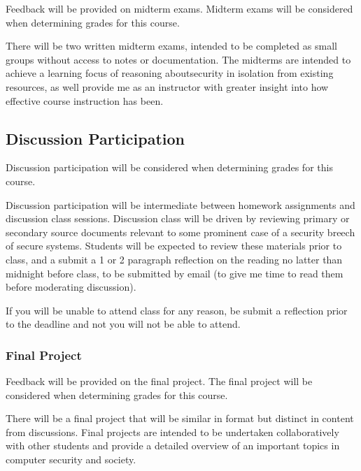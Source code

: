 \documentclass[11pt]{article}
\begin{document}
Feedback will be provided on midterm exams.  Midterm exams will be considered when determining grades for this course.

There will be two written midterm exams, intended to be completed as small groups
without access to notes or documentation. The midterms are intended to achieve a learning
focus of reasoning aboutsecurity in isolation from existing resources,
as well provide me as an instructor with greater insight into how effective course
instruction has been.

\subsection*{Discussion Participation}

Discussion participation will be considered when determining grades for this course.

Discussion participation will be intermediate between homework assignments and discussion class
sessions. Discussion class will be driven by reviewing primary or secondary source documents relevant to some prominent case of a security breech of secure systems. Students will be expected to review these materials prior to class, and a submit a 1 or 2 paragraph reflection on the reading no latter than midnight before class, to be submitted by email (to give me time to read them before moderating discussion).

If you will be unable to attend class for any reason, be submit a reflection prior to the deadline and not you will not be able to attend.

\subsubsection*{Final Project}

Feedback will be provided on the final project. The final project will be considered when determining grades for this course.

There will be a final project that will be similar in format but distinct in content from
discussions. Final projects are intended to be undertaken collaboratively with other 
students and provide a detailed overview of an important topics in computer security and 
society.
\end{document}
